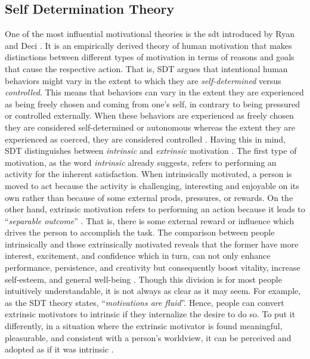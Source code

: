 \subsection{Self Determination Theory}
One of the most influential motivational theories is the \acrlong{sdt} introduced by Ryan and Deci \cite{deci1994promoting, ryan2000intrinsic, ryan2000self, deci2000and}. It is an empirically derived theory of human motivation that makes distinctions between different types of motivation in terms of reasons and goals that cause the respective action. That is, SDT argues that intentional human behaviors might vary in the extent to which they are \textit{self-determined} versus \textit{controlled}. This means that behaviors can vary in the extent they are experienced as being freely chosen and coming from one's self, in contrary to being pressured or controlled externally. When these behaviors are experienced as freely chosen they are considered self-determined or autonomous whereas the extent they are experienced as coerced, they are considered controlled \cite{deci1994promoting}. Having this in mind, SDT distinguishes between \textit{intrinsic} and \textit{extrinsic} motivation \cite{ryan2000intrinsic}. The first type of motivation, as the word \textit{intrinsic} already suggests, refers to performing an activity for the inherent satisfaction. When intrinsically motivated, a person is moved to act because the activity is challenging, interesting and enjoyable on its own rather than because of some external prods, pressures, or rewards. On the other hand, extrinsic motivation refers to performing an action because it leads to ``\textit{separable outcome}'' \cite{ryan2000self}. That is, there is some external reward or influence which drives the person to accomplish the task. The comparison between people intrinsically and those extrinsically motivated reveals that the former have more interest, excitement, and confidence which in turn, can not only enhance performance, persistence, and creativity but consequently boost vitality, increase self-esteem, and general well-being \cite{ryan2000self}. Though this division is for most people intuitively understandable, it is not always as clear as it may seem. For example, as the SDT theory states, ``\textit{motivations are fluid}''. Hence, people can convert extrinsic motivators to intrinsic if they internalize the desire to do so. To put it differently, in a situation where the extrinsic motivator is found meaningful, pleasurable, and consistent with a person's worldview, it can be perceived and adopted as if it was intrinsic \cite{zichermann2012}.
